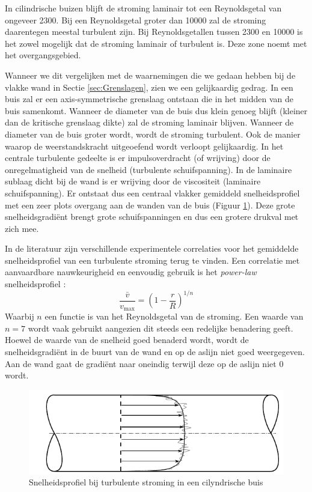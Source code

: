 In cilindrische buizen blijft de stroming laminair tot een Reynoldsgetal van ongeveer 2300. Bij een Reynoldsgetal groter dan 10000 zal de stroming daarentegen meestal turbulent zijn. Bij Reynoldsgetallen tussen 2300 en 10000 is het zowel mogelijk dat de stroming laminair of turbulent is. Deze zone noemt met het overgangsgebied.

Wanneer we dit vergelijken met de waarnemingen die we gedaan hebben bij de vlakke wand in Sectie \ref{sec:Grenslagen}, zien we een gelijkaardig gedrag. In een buis zal er een axis-symmetrische grenslaag ontstaan die in het midden van de buis samenkomt. Wanneer de diameter van de buis dus klein genoeg blijft (kleiner dan de kritische grenslaag dikte) zal de stroming laminair blijven. Wanneer de diameter van de buis groter wordt, wordt de stroming turbulent. Ook de manier waarop de weerstandskracht uitgeoefend wordt verloopt gelijkaardig. In het centrale turbulente gedeelte is er impulsoverdracht (of wrijving) door de onregelmatigheid van de snelheid (turbulente schuifspanning). In de laminaire sublaag dicht bij de wand is er wrijving door de viscositeit (laminaire schuifspanning). Er ontstaat dus een centraal vlakker gemiddeld snelheidsprofiel met een zeer plots overgang aan de wanden van de buis (Figuur \ref{fig:turbulent_snelheidsprofiel}). Deze grote snelheidsgradiënt brengt grote schuifspanningen en dus een grotere drukval met zich mee.

In de literatuur zijn verschillende experimentele correlaties voor het gemiddelde snelheidsprofiel van een turbulente stroming terug te vinden. Een correlatie met aanvaardbare nauwkeurigheid en eenvoudig gebruik is het \emph{power-law} snelheidsprofiel \cite{Munson2010}:
\begin{equation}
	\frac{\bar{v}}{v_{\text{max}}} = \left(1- \frac{r}{R}\right)^{1/n}
\end{equation}
Waarbij $n$ een functie is van het Reynoldsgetal van de stroming. Een waarde van $n=7$ wordt vaak gebruikt aangezien dit steeds een redelijke benadering geeft. Hoewel de waarde van de snelheid goed benaderd wordt, wordt de snelheidsgradiënt in de buurt van de wand en op de aslijn niet goed weergegeven. Aan de wand gaat de gradiënt naar oneindig terwijl deze op de aslijn niet $0$ wordt.
\begin{figure}[htb]
	\centering
	\includegraphics{fig/inwendige_stroming/Turbulent_snelheidsprofiel}
	\caption{Snelheidsprofiel bij turbulente stroming in een cilyndrische buis}
	\label{fig:turbulent_snelheidsprofiel}
\end{figure}

